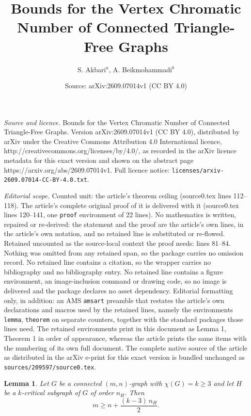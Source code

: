 \documentclass[10pt,a4paper]{amsart}
\title{Bounds for the Vertex Chromatic Number of Connected Triangle-Free Graphs}
\author{S. Akbari$^{a}$, A. Beikmohammadi$^{b}$ \smallskip}
\date{Source: arXiv:2609.07014v1 (CC BY 4.0)}
\newtheorem{lemma}{Lemma}
\begin{document}
\maketitle

\noindent\emph{Source and licence.} Bounds for the Vertex Chromatic Number of Connected Triangle-Free Graphs. Version arXiv:2609.07014v1 (CC BY 4.0), distributed by arXiv under the Creative Commons Attribution 4.0 International licence, http://creativecommons.org/licenses/by/4.0/, as recorded in the arXiv licence metadata for this exact version and shown on the abstract page https://arxiv.org/abs/2609.07014v1. Full licence notice: \texttt{licenses/arxiv-2609.07014-CC-BY-4.0.txt}.\par\smallskip

\noindent\textit{Editorial scope.} Counted unit: the article's theorem ceiling (source0.tex lines 112--118). The article's complete original proof of it is delivered with it (source0.tex lines 120--141, one \texttt{proof} environment of 22 lines). No mathematics is written, repaired or re-derived: the statement and the proof are the article's own lines, in the article's own notation, and no retained line is substituted or re-flowed.  Retained uncounted as the source-local context the proof needs: lines 81--84.  Nothing was omitted from any retained span, so the package carries no omission record.  No retained line contains a citation, so the wrapper carries no bibliography and no bibliography entry.  No retained line contains a figure environment, an image-inclusion command or drawing code, so no image is delivered and the package declares no asset dependency.  Editorial formatting only, in addition: an AMS \texttt{amsart} preamble that restates the article's own declarations and macros used by the retained lines, namely the environments \texttt{lemma}, \texttt{theorem} on separate counters, together with the standard packages those lines need.  The retained environments print in this document as Lemma 1, Theorem 1 in order of appearance, whereas the article prints the same items with the numbering of its own full document.  The complete native source of the article as distributed in the arXiv e-print for this exact version is bundled unchanged as \texttt{sources/209597/source0.tex}.
\begin{lemma} \label{lemma: density}
Let $G$ be a connected $(m,n)$-graph with $\chi(G) = k \geq 3$ and let $H$ be a $k$-critical subgraph of $G$ of order $n_H$. Then
$$m \geq n + \frac{(k-3)\,n_H}{2}.$$
\end{lemma}
\end{document}
